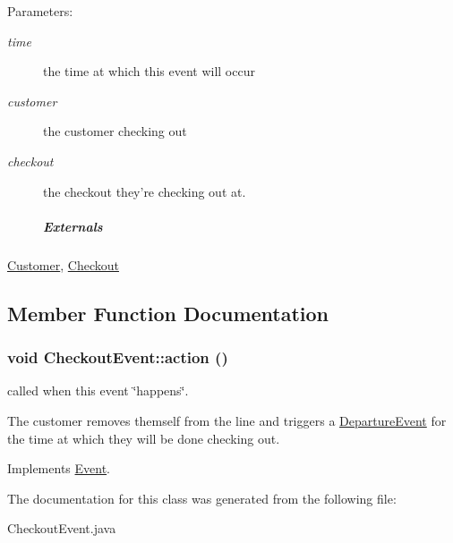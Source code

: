 \begin{Desc}
\item[Parameters:]
\begin{description}
\item[{\em time}]the time at which this event will occur \item[{\em customer}]the customer checking out \item[{\em checkout}]the checkout they're checking out at. \subparagraph*{Externals}\end{description}
\end{Desc}
\hyperlink{class_customer}{Customer}, \hyperlink{class_checkout}{Checkout} 

\subsection{Member Function Documentation}
\hypertarget{class_checkout_event_cd029a04de786e0d128b3f4220724d4f}{
\subsubsection[{action}]{\setlength{\rightskip}{0pt plus 5cm}void CheckoutEvent::action ()}}
\label{class_checkout_event_cd029a04de786e0d128b3f4220724d4f}


called when this event \char`\"{}happens\char`\"{}. 

The customer removes themself from the line and triggers a \hyperlink{class_departure_event}{DepartureEvent} for the time at which they will be done checking out. 

Implements \hyperlink{class_event_fea360b9a95713e43cf3f9fa44150074}{Event}.

The documentation for this class was generated from the following file:\begin{CompactItemize}
\item 
CheckoutEvent.java\end{CompactItemize}
